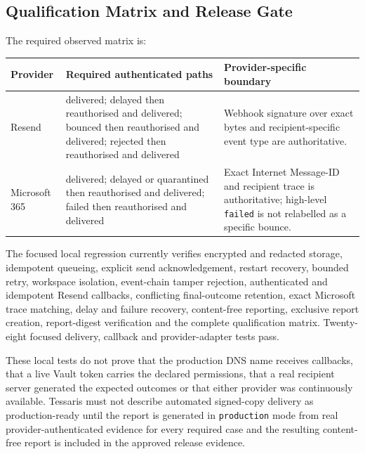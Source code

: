 \subsection{Qualification Matrix and Release Gate}

The required observed matrix is:

\begin{center}
\begin{tabularx}{\textwidth}{@{}lXX@{}}
\toprule
\textbf{Provider} & \textbf{Required authenticated paths} &
\textbf{Provider-specific boundary} \\
\midrule
Resend & delivered; delayed then reauthorised and delivered; bounced then
reauthorised and delivered; rejected then reauthorised and delivered & Webhook
signature over exact bytes and recipient-specific event type are authoritative. \\
Microsoft 365 & delivered; delayed or quarantined then reauthorised and
delivered; failed then reauthorised and delivered & Exact Internet Message-ID
and recipient trace is authoritative; high-level \texttt{failed} is not relabelled
as a specific bounce. \\
\bottomrule
\end{tabularx}
\end{center}

The focused local regression currently verifies encrypted and redacted storage,
idempotent queueing, explicit send acknowledgement, restart recovery, bounded
retry, workspace isolation, event-chain tamper rejection, authenticated and
idempotent Resend callbacks, conflicting final-outcome retention, exact Microsoft
trace matching, delay and failure recovery, content-free reporting, exclusive
report creation, report-digest verification and the complete qualification
matrix.  Twenty-eight focused delivery, callback and provider-adapter tests pass.

These local tests do not prove that the production DNS name receives callbacks,
that a live Vault token carries the declared permissions, that a real recipient
server generated the expected outcomes or that either provider was continuously
available.  Tessaris must not describe automated signed-copy delivery as
production-ready until the report is generated in \texttt{production} mode from
real provider-authenticated evidence for every required case and the resulting
content-free report is included in the approved release evidence.
